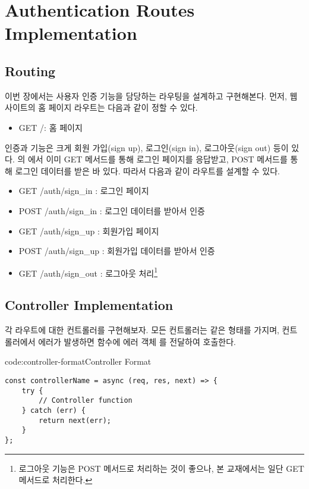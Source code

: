 \section{Authentication Routes Implementation}\label{sect:auth-routes-implementation}

\subsection*{Routing}

이번 장에서는 사용자 인증 기능을 담당하는 라우팅을 설계하고 구현해본다. 먼저, 웹 사이트의 홈 페이지 라우트는 다음과 같이 정할 수 있다.

\begin{itemize}
    \item GET /: 홈 페이지
\end{itemize}

인증과 기능은 크게 회원 가입(sign up), 로그인(sign in), 로그아웃(sign out) 등이 있다. 의 에서 이미 GET 메서드를 통해 로그인 페이지를 응답받고, POST 메서드를 통해 로그인 데이터를 받은 바 있다. 따라서 다음과 같이 라우트를 설계할 수 있다.

\begin{itemize}
    \item GET /auth/sign\_in : 로그인 페이지
    \item POST /auth/sign\_in : 로그인 데이터를 받아서 인증
    \item GET /auth/sign\_up : 회원가입 페이지
    \item POST /auth/sign\_up : 회원가입 데이터를 받아서 인증
    \item GET /auth/sign\_out : 로그아웃 처리\footnote{로그아웃 기능은 POST 메서드로 처리하는 것이 좋으나, 본 교재에서는 일단 GET 메서드로 처리한다.}
\end{itemize}

\subsection*{Controller Implementation}

각 라우트에 대한 컨트롤러를 구현해보자. 모든 컨트롤러는 \와 같은 형태를 가지며, 컨트롤러에서 에러가 발생하면  함수에 에러 객체 를 전달하여 호출한다.

\begin{codeenv}{code:controller-format}{Controller Format}\begin{verbatim}
const controllerName = async (req, res, next) => {
    try {
        // Controller function
    } catch (err) {
        return next(err);
    }
};
\end{verbatim}
\end{codeenv}

